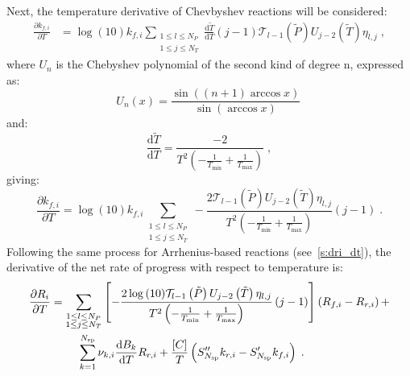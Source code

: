 \documentclass[12pt,number,sort&compress]{elsarticle}
\begin{document}
Next, the temperature derivative of Chevbyshev reactions will be considered:
\begin{align}
 \frac{\partial {k_{f, i}} }{\partial T } &= \log{\left (10 \right )} {k_{f, i}} \sum_{\substack{1 \leq l \leq N_{P}\\1 \leq j \leq N_{T}}} \frac{\text{d} \tilde{T} }{\text{d} T } \left(j - 1\right) \mathcal{T}_{l - 1}\left(\tilde{P}\right) U_{j - 2}\left(\tilde{T}\right) \eta_{l,j} \;,
\end{align}
where $U_n$ is the Chebyshev polynomial of the second kind of degree n, expressed as:
\begin{equation}
 U_n \left(x\right) = \frac{\sin\left(\left(n + 1\right) \arccos x\right)}{\sin \left(\arccos x \right)}\,
\end{equation}
and:
\begin{equation}
 \frac{\text{d} \tilde{T}}{\text{d} T} = \frac{-2}{T^2 \left(-\frac{1}{T_{\min}} + \frac{1}{T_{\text{max}}}\right)}\;,
\end{equation}
giving:
\begin{equation}
 \frac{\partial {k_{f, i}} }{\partial T } = \log{\left (10 \right )} {k_{f, i}} \sum_{\substack{1 \leq l \leq N_{P}\\1 \leq j \leq N_{T}}} - \frac{2 \mathcal{T}_{l - 1}\left(\tilde{P}\right) U_{j - 2}\left(\tilde{T}\right) \eta_{l,j}}{T^{2} \left(- \frac{1}{T_{\min}} + \frac{1}{T_{\max}}\right)} \left(j - 1\right)\;.
\end{equation}
Following the same process for Arrhenius-based reactions (see~\cref{s:dri_dt}), the derivative of the net rate of progress with respect to temperature is:
\begin{align}
 \label{e:drop_cheb_dT}
 \frac{\partial R_{i}}{\partial T } &= \sum_{\substack{1 \leq l \leq N_{P}\\1 \leq j \leq N_{T}}} \left[ - \frac{2 \log{\left (10 \right )} \mathcal{T}_{l - 1}\left(\tilde{P}\right) U_{j - 2}\left(\tilde{T}\right) \eta_{l,j}}{T^{2} \left(- \frac{1}{T_{\min}} + \frac{1}{T_{\max}}\right)} \left(j - 1\right) \right] \left({R_{f, i}} - {R_{r, i}}\right) + \nonumber \\
				     & \mathindent \sum_{k=1}^{\ns/} \nu_{k,i} \frac{\text{d} B_{k} }{\text{d} T } {R_{r, i}} + \frac{[C]}{T} \left(S^{\prime\prime}_{\ns/} {k_{r, i}} - S^{\prime}_{\ns/} {k_{f, i}}\right)\;.
\end{align}
\end{document}
